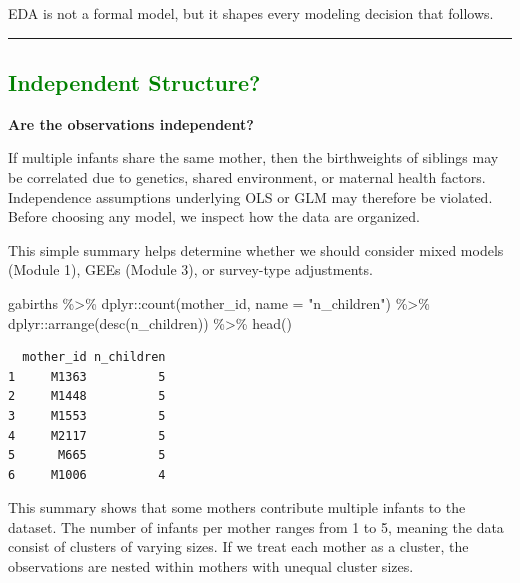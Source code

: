 \documentclass[
  letterpaper,
  DIV=11,
  numbers=noendperiod]{scrreprt}
\newenvironment{Shaded}{\begin{snugshade}}{\end{snugshade}}
\newcommand{\AttributeTok}[1]{\textcolor[rgb]{0.40,0.45,0.13}{#1}}
\newcommand{\FunctionTok}[1]{\textcolor[rgb]{0.28,0.35,0.67}{#1}}
\newcommand{\NormalTok}[1]{\textcolor[rgb]{0.00,0.23,0.31}{#1}}
\newcommand{\SpecialCharTok}[1]{\textcolor[rgb]{0.37,0.37,0.37}{#1}}
\newcommand{\StringTok}[1]{\textcolor[rgb]{0.13,0.47,0.30}{#1}}
\begin{document}
EDA is not a formal model, but it shapes every modeling decision that
follows.

\begin{center}\rule{0.5\linewidth}{0.5pt}\end{center}

\hypertarget{section-55}{%
\subsection*{\texorpdfstring{\textcolor{green}{Independent Structure?}}{}}\label{section-55}}

\textbf{Are the observations independent?}

If multiple infants share the same mother, then the birthweights of
siblings may be correlated due to genetics, shared environment, or
maternal health factors. Independence assumptions underlying OLS or GLM
may therefore be violated. Before choosing any model, we inspect how the
data are organized.

This simple summary helps determine whether we should consider mixed
models (Module 1), GEEs (Module 3), or survey-type adjustments.

\begin{Shaded}
\begin{Highlighting}[]
\NormalTok{gabirths }\SpecialCharTok{\%\textgreater{}\%}
\NormalTok{dplyr}\SpecialCharTok{::}\FunctionTok{count}\NormalTok{(mother\_id, }\AttributeTok{name =} \StringTok{"n\_children"}\NormalTok{) }\SpecialCharTok{\%\textgreater{}\%}
\NormalTok{dplyr}\SpecialCharTok{::}\FunctionTok{arrange}\NormalTok{(}\FunctionTok{desc}\NormalTok{(n\_children)) }\SpecialCharTok{\%\textgreater{}\%}
\FunctionTok{head}\NormalTok{()}
\end{Highlighting}
\end{Shaded}

\begin{verbatim}
  mother_id n_children
1     M1363          5
2     M1448          5
3     M1553          5
4     M2117          5
5      M665          5
6     M1006          4
\end{verbatim}

This summary shows that some mothers contribute multiple infants to the
dataset. The number of infants per mother ranges from 1 to 5, meaning
the data consist of clusters of varying sizes. If we treat each mother
as a cluster, the observations are nested within mothers with unequal
cluster sizes.
\end{document}
